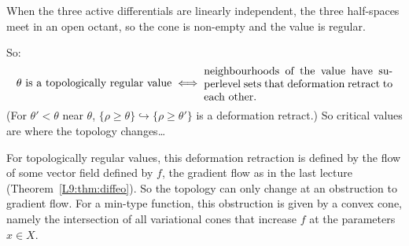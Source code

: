 \documentclass[11pt,openany]{book}
\theoremstyle{plain}
\theoremstyle{definition}
\theoremstyle{remark}
\newcommand{\added}[1]{{\color{addcol}#1}}
\newcommand{\Sph}{\mathbb{S}}          %
\begin{document}
\begin{center}
\end{center}
\added{When the three active differentials are linearly independent, the three half-spaces meet in
an open octant, so the cone is non-empty and the value is regular.}

So:
\[
  \text{$\theta$ is a topologically regular value}\iff
  \begin{minipage}[c]{0.5\linewidth}
  neighbourhoods of the value have superlevel sets that deformation retract to each other.
  \end{minipage}
\]
\added{(For $\theta'<\theta$ near $\theta$, $\{\rho\ge\theta\}\hookrightarrow\{\rho\ge\theta'\}$ is
a deformation retract.)} So critical values are where the topology changes\dots

For topologically regular values, this deformation retraction is defined by the flow of some vector
field defined by $f$, the gradient flow as in the last lecture (Theorem~\ref{L9:thm:diffeo}).
So the topology can only change at an obstruction to gradient flow.
For a min-type function, this obstruction is given by a convex cone, namely the intersection
of all variational cones that increase $f$ at the parameters $x\in X$.
\end{document}
